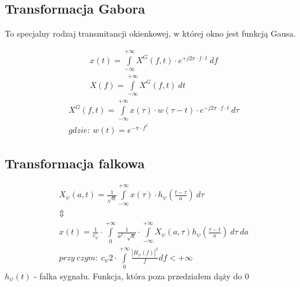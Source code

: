     \subsection{Transformacja Gabora}
        \tab To specjalny rodzaj transmitancji okienkowej, w której okno jest funkcją Gausa.
        \begin{multicols}{2}
            \begin{gather*}
                x(t) = \int \limits_{-\infty}^{+\infty} X^G(f, t)\cdot e^{+j2\pi \cdot f \cdot t}\ df\\
                 X(f) = \int \limits_{-\infty}^{+\infty} X^G(f, t)\ dt
            \end{gather*}\hfill\noindent
            \noindent
            \begin{gather*}
                X^G(f, t) = \int \limits_{-\infty}^{+\infty}x(\tau)\cdot w(\tau-t)\cdot e^{-j2\pi\cdot f\cdot t}\ d\tau\\
                gdzie:\ w(t) = e^{-\pi\cdot f^2}
            \end{gather*}
        \end{multicols}

    \subsection{Transformacja falkowa}
    \begin{gather*}
        X_\psi(a, t) = \frac{1}{\sqrt{a}}\int\limits_{-\infty}^{+\infty}x(\tau)\cdot h_\psi\left(\frac{t-\tau}{a}\right)\ d\tau\\
        \Updownarrow\\
        x(t) = \frac{1}{c_\psi}\cdot \int\limits_{0}^{+\infty}\frac{1}{a^2\cdot\sqrt{a}}\cdot \int\limits_{-\infty}^{+\infty}X_\psi(a, \tau)h_\psi\left(\frac{\tau-t}{a}\right)\ d\tau\ da\\
        przy\ czym:\ c_\psi 2\cdot \int\limits_{0}^{+\infty}\frac{|H_\psi(f)|^2}{f}df < +\infty
    \end{gather*}
    $h_\psi(t)$ - falka sygnału. Funkcja, która poza przedziałem dąży do 0
    